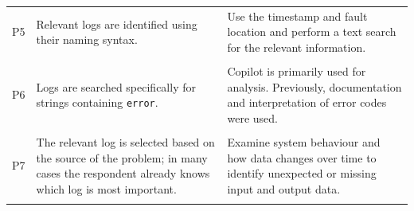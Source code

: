 \begin{longtable}{
    @{}
    >{\centering\arraybackslash}p{}
    >{\RaggedRight\arraybackslash}p{}
    >{\RaggedRight\arraybackslash}p{}
    @{}
}
P5 &
Relevant logs are identified using their naming syntax. &
Use the timestamp and fault location and perform a text search for the
relevant information.
\\\\[0.15em]

P6 &
Logs are searched specifically for strings containing \texttt{error}. &
Copilot is primarily used for analysis. Previously, documentation and
interpretation of error codes were used.
\\\\[0.15em]

P7 &
The relevant log is selected based on the source of the problem; in
many cases the respondent already knows which log is most important. &
Examine system behaviour and how data changes over time to identify
unexpected or missing input and output data.
\\\\
\end{longtable}
\endgroup

